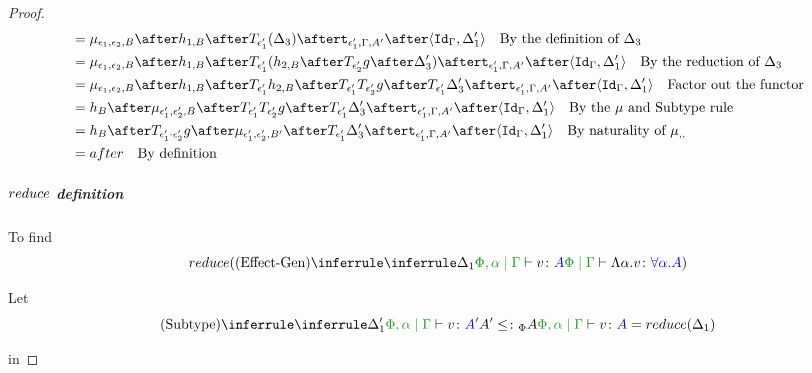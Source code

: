 \documentclass{report}
\begin{document}
\begin{framed}
\begin{proof}
\begin{align*}
                            &= \bind{\e_1}{\e_2}{B}\after 
                            h_{1, B}\after\T{\e_1'}{(\D_3)}\after
                            \tstrength{\e_1'}{\G}{A'}\after\pr{\idg}{\D_1'}\qt{By the definition of $\D_3$}\\
                            &= \bind{\e_1}{\e_2}{B}\after 
                            h_{1, B}\after\T{\e_1'}{(h_{2, B}\after\T{\e_2'}{g}\after \D_3')}\after
                            \tstrength{\e_1'}{\G}{A'}\after\pr{\idg}{\D_1'}\qt{By the reduction of $\D_3$}\\
                            &= \bind{\e_1}{\e_2}{B}\after 
                            h_{1, B}\after\T{\e_1'}{h_{2, B}}\after\T{\e_1'}{\T{\e_2'}{g}}\after \T{\e_1'}{\D_3'}\after
                            \tstrength{\e_1'}{\G}{A'}\after\pr{\idg}{\D_1'}\qt{Factor out the functor}\\
                            &= h_B\after\bind{\e_1'}{\e_2'}{B}\after\T{\e_1'}{\T{\e_2'}{g}}\after \T{\e_1'}{\D_3'}\after
                            \tstrength{\e_1'}{\G}{A'}\after\pr{\idg}{\D_1'}\qt{By the $\mu$ and Subtype rule }\\
                            & = h_B\after\T{\e_1'\dot\e_2'}{g}\after\bind{\e_1'}{\e_2'}{B'}\after \T{\e_1'}{\D_3'}\after
                            \tstrength{\e_1'}{\G}{A'}\after\pr{\idg}{\D_1'}\qt{By naturality of $\bind{}{}{}$ }\\
                            & = after \qt{By definition}
                        \end{align*}
        
                \subparagraph{$reduce$ definition}
        
                
                To find 
                \begin{equation}
                    \reduce(\ntreeruleI{Effect-Gen}{\treeruleI{\D_1}{\etyperelation{\P,\a}{\G}{v}{A}}}{\gpetyperelation{\elam{\a}{v}}{\all{\a}{A}}})
                \end{equation}
        
                Let
                \begin{equation}
                    \ntreeruleII{Subtype}{\treeruleI{\D_1'}{\etyperelation{\P,\a}{\G}{v}{A'}}}{ A'\subtypep A}{\etyperelation{\P,\a}{\G}{v}{A}} = \reduce(\D_1)
                \end{equation}
        
                in 
        

\end{proof}
\end{framed}
\end{document}
